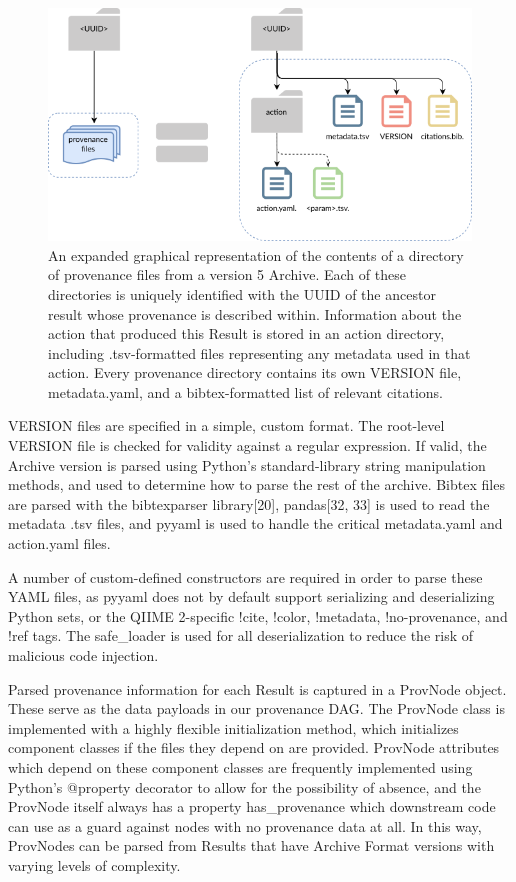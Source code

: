 \begin{figure}[htp]
\centering
\includegraphics[width=\textwidth]{figures/prov_files.png}
\caption[Diagram of the provenance file directories in a QIIME 2 Archive]%
{An expanded graphical representation of the contents of a directory of
provenance files from a version 5 Archive. Each of these directories is uniquely
identified with the UUID of the ancestor result whose provenance is described
within. Information about the action that produced this Result is stored in an
action directory, including .tsv-formatted files representing any metadata used
in that action. Every provenance directory contains its own VERSION file,
metadata.yaml, and a bibtex-formatted list of relevant citations.}
\label{fig:provenance_files}
\end{figure}
VERSION files are specified in a simple, custom format. The root-level VERSION
file is checked for validity against a regular expression. If valid, the Archive
version is parsed using Python’s standard-library string manipulation methods,
and used to determine how to parse the rest of the archive. Bibtex files are
parsed with the bibtexparser library[20], pandas[32, 33] is used to read the
metadata .tsv files, and pyyaml is used to handle the critical metadata.yaml and
action.yaml files.

A number of custom-defined constructors are required in order to parse these
YAML files, as pyyaml does not by default support serializing and deserializing
Python sets, or the QIIME 2-specific !cite, !color, !metadata, !no-provenance,
and !ref tags. The safe\_loader is used for all deserialization to reduce the
risk of malicious code injection.

Parsed provenance information for each Result is captured in a ProvNode object.
These serve as the data payloads in our provenance DAG. The ProvNode class is
implemented with a highly flexible initialization method, which initializes
component classes if the files they depend on are provided. ProvNode attributes
which depend on these component classes are frequently implemented using
Python’s @property decorator to allow for the possibility of absence, and the
ProvNode itself always has a property has\_provenance which downstream code can
use as a guard against nodes with no provenance data at all. In this way,
ProvNodes can be parsed from Results that have Archive Format versions with
varying levels of complexity. 


